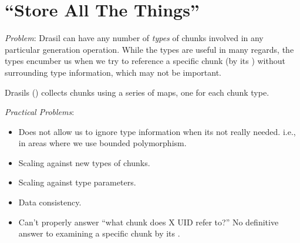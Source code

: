 \chapter{``Store All The Things''}
\label{chap:storingChunks}

\begin{writingdirectives}

      \item \textit{Problem}: Drasil can have any number of \textit{types} of
            chunks involved in any particular generation operation. While the
            types are useful in many regards, the types encumber us when we try
            to reference a specific chunk (by its \UID{}) without surrounding
            type information, which may not be important.

      \item Drasils \ChunkDB{} () collects chunks
            using a series of maps, one for each chunk type.

      \item \textit{Practical Problems}:
            \begin{itemize}

                  \item Does not allow us to ignore type information when its
                        not really needed. i.e., in areas where we use bounded
                        polymorphism.


                  \item Scaling against new types of chunks.
                  
                  \item Scaling against type parameters.
                  
                  \item Data consistency.
                  
                  \item Can't properly answer ``what chunk does X UID refer
                        to?'' No definitive answer to examining a specific chunk
                        by its \UID{}.

            \end{itemize}


\end{writingdirectives}
